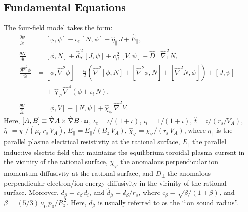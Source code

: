 \documentclass[12pt,prb,aps]{revtex4-1}
\begin{document}
\subsection{Fundamental Equations}
The four-field model takes the form:\,\cite{fw,cole,rf2022}
\begin{align}\label{e12v}
\frac{\partial\psi}{\partial\hat{t}}&= [\phi,\psi] -\iota_e\,[N,\psi]
+\hat{\eta}_\parallel\,J + \hat{E}_\parallel,\\[0.5ex]
\frac{\partial N}{\partial \hat{t}}&= [\phi,N] +\hat{d}_\beta^{\,2}\,[J,\psi]+c_\beta^{\,2}\,[V,\psi] 
+ \hat{D}_\perp\,\hat{\nabla}_\perp^{\,2}N,\\[0.5ex]
\frac{\partial \hat{\nabla}^2\phi}{\partial \hat{t}}&= [\phi,\hat{\nabla}^2\phi] - \frac{\iota_i}{2}\left(\hat{\nabla}^2[\phi,N] + [\hat{\nabla}^2\phi,N] + [\hat{\nabla}^2 N,\phi]\right) + [J,\psi] \nonumber\\[0.5ex]&\phantom{=}+\hat{\chi}_\varphi  \,\hat{\nabla}^4\!\left(\phi + \iota_i\,N\right), \\[0.5ex]
\frac{\partial V}{\partial\hat{t}}&= [\phi,V] +[N,\psi] + \hat{\chi}_\varphi\,\hat{\nabla}^2 V.\label{e21}
\end{align}
Here, $[A,B]\equiv \hat{\nabla} A\times \hat{\nabla} B\cdot {\bf n}$, $\iota_e=\iota/(1+\iota)$, $\iota_i=1/(1+\iota)$, $\hat{t} = t/(r_s/V_A)$, $\hat{\eta}_{\parallel} = \eta_{\parallel}/(\mu_0\,r_s\,V_A)$, $\hat{E}_\parallel = E_\parallel/(B_z\,V_A)$, 
$\hat{\chi}_\varphi= \chi_\varphi/(r_s\,V_A)$, where $\eta_{\parallel}$ is the parallel  plasma electrical
resistivity at the rational surface, $E_\parallel$ the parallel inductive electric field that maintains the equilibrium toroidal
plasma current in the vicinity of the rational surface, $\chi_\varphi$  the anomalous perpendicular ion momentum
diffusivity at the rational surface, and $D_\perp$ the  anomalous perpendicular electron/ion  energy diffusivity in the vicinity of the rational surface. 
Moreover, $d_\beta=c_\beta\,d_i$, and $\hat{d}_\beta=d_\beta/r_s$, where $c_\beta = \sqrt{\beta/(1+\beta)}$, and
$\beta=(5/3)\,\mu_0\,p_0/B_z^{\,2}$. Here, $d_\beta$ is usually referred to as the ``ion sound radius''.  
\end{document}
